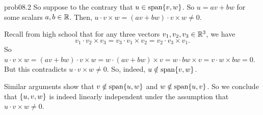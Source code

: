 \begin{sol}{prob08.2}
So suppose to the contrary that $u\in \textrm{span}\{v,w\}$. So $u= av + b w$ for some scalars $a,b \in \mathbb{R}$. Then, $u\cdot v\times w=(av + b w)\cdot v\times w\not=0$. 

Recall from high school that for any three vectors $v_1, v_2, v_3 \in \mathbb{R}^3$, we have $$v_1\cdot v_2\times v_3=v_3\cdot v_1\times v_2=v_2\cdot v_3\times v_1.$$ So $u\cdot v\times w=(av + b w)\cdot v\times w =w\cdot (av + b w)\times v=w \cdot bw \times v= v\cdot w \times bw=0$. But this contradicts  $u\cdot v\times w \not=0$. So, indeed, $u\notin \textrm{span}\{v,w\}$.

Similar arguments show that $v\notin \textrm{span}\{u,w\}$ and $w\notin \textrm{span}\{u,v\}$. So we conclude that $\{u,v,w \}$ is indeed  linearly independent under the assumption that $u\cdot v\times w \not=0$.

\medskip 
 
\end{sol}